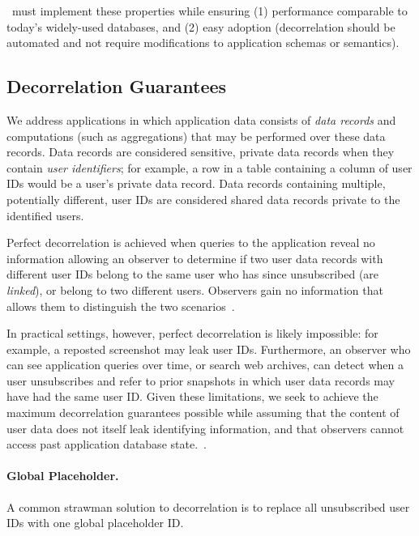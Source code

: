 \sys~must implement these properties while ensuring (1) performance comparable to today’s
widely-used databases, and (2) easy adoption (decorrelation should be
automated and not require modifications to application schemas or semantics).

\subsection{Decorrelation Guarantees} 

We address applications in which application data consists of \emph{data records} and computations
(such as aggregations) that may be performed over these data records. Data records are considered
sensitive, private data records when they contain \emph{user identifiers}; for example, a row in a
table containing a column of user IDs would be a user's private data record. Data records containing
multiple, potentially different, user IDs are considered shared data records private to the
identified users.

Perfect decorrelation is achieved when queries to the application reveal no information allowing an
observer to determine if two user data records with different user IDs belong to the same user who
has since unsubscribed (are \emph{linked}), or belong to two different users. Observers gain no
information that allows them to distinguish the two scenarios~.

In practical settings, however, perfect decorrelation is likely impossible: for example, a reposted
screenshot may leak user IDs. Furthermore, an observer who can see application queries over time, or
search web archives, can detect when a user unsubscribes and refer to prior snapshots in which user
data records may have had the same user ID.  Given these limitations, we seek to achieve the maximum
decorrelation guarantees possible while assuming that the content of user data does not itself leak
identifying information, and that observers cannot access past application database
state.~.

\paragraph{Global Placeholder.}
A common strawman solution to decorrelation is to replace all unsubscribed user IDs with one global
placeholder ID. 

